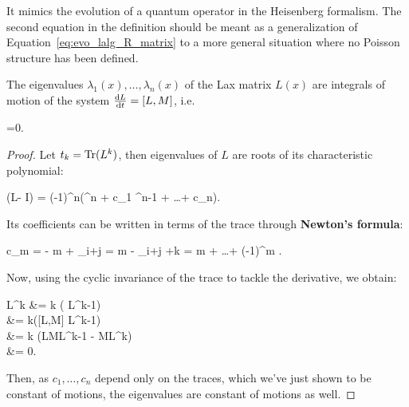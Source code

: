 \documentclass[main.tex]{subfiles}
\begin{document}
It mimics the evolution of a quantum operator in the Heisenberg formalism. The second equation in the definition should be meant as a generalization of Equation~\eqref{eq:evo_lalg_R_matrix} to a more general situation where no Poisson structure has been defined.

\begin{proposition}
	The eigenvalues $\lambda_1(x), \ldots, \lambda_n(x)$ of the Lax matrix $L(x)$ are integrals of motion of the system $\frac{\mathrm{d}{L}}{\mathrm{d}{t}} = [L,M]$, i.e.
	\begin{eqalign}
		=0.
	\end{eqalign}
\end{proposition}
\begin{proof}
	Let $t_k = \operatorname{Tr} (L^k)$, then eigenvalues of $L$ are roots of its characteristic polynomial:
	\begin{eqalign}
		\det(L- \lambda I) = (-1)^n(\lambda^n + c_1 \lambda^{n-1} + \ldots + c_n).
	\end{eqalign}
	Its coefficients can be written in terms of the trace through \textbf{Newton's formula}:
	\begin{eqalign}
		c_m = - m +  \sum_{i+j = m}  -  \sum_{i+j +k = m}  + \ldots + (-1)^m \frac{t_1^m}{m!}.
	\end{eqalign}
	Now, using the cyclic invariance of the trace to tackle the derivative, we obtain:
	\begin{eqalign}
		 \trace L^k &= k \trace\Big( L^{k-1}\Big)\\ 
			&= k\trace ([L,M] L^{k-1})\\
			&= k \trace (LML^{k-1} - ML^k)\\
			&= 0.
	\end{eqalign}
	Then, as $c_1, \ldots, c_n$ depend only on the traces, which we've just shown to be constant of motions, the eigenvalues are constant of motions as well.
\end{proof}
\end{document}
